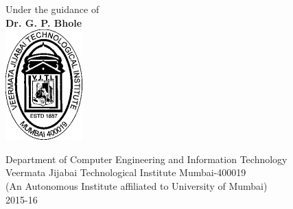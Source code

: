 \begin{titlepage}
\begin{center}
\vspace{0.5cm}
Under the guidance of\\
\vspace{0.2cm}
\large \textbf{Dr. G. P.  Bhole}\\
\vspace{1cm}
\includegraphics{images/logo.jpg}\\
\vspace{0.3cm}
\end{center}
\begin{center}
{\large Department of Computer Engineering and Information Technology}\\
\vspace{0.2cm}
{\large Veermata Jijabai Technological Institute Mumbai-400019}\\
\vspace{0.2cm}
{\large (An Autonomous Institute affiliated to University of Mumbai)}\\
\vspace{0.2cm}
{\large 2015-16}
\end{center}
\end{titlepage}
\makeatother